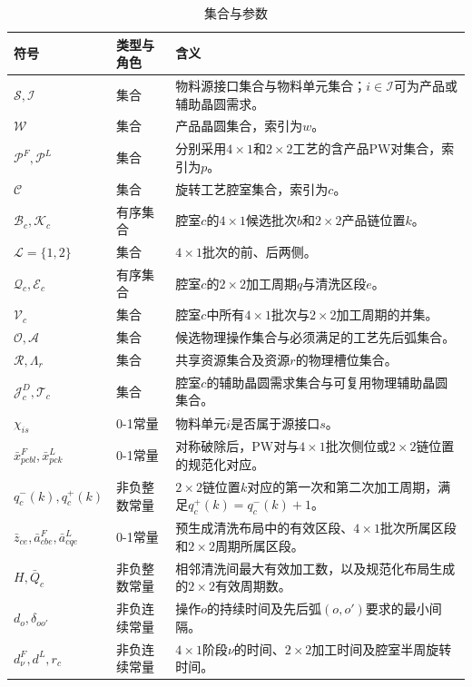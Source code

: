\documentclass[final,5p,times,twocolumn]{elsarticle}
\begin{document}
\begin{table}[t]
\centering
\scriptsize
\setlength{\tabcolsep}{2.5pt}
\caption{集合与参数}
\label{tab:symbol-cn-a}
\begin{tabular}{p{}p{}p{}}
\toprule
符号 & 类型与角色 & 含义 \\
\midrule
$\mathcal S,\mathcal I$ & 集合 & 物料源接口集合与物料单元集合；$i\in\mathcal I$可为产品或辅助晶圆需求。\\
$\mathcal W$ & 集合 & 产品晶圆集合，索引为$w$。\\
$\mathcal P^F,\mathcal P^L$ & 集合 & 分别采用$4\times1$和$2\times2$工艺的含产品PW对集合，索引为$p$。\\
$\mathcal C$ & 集合 & 旋转工艺腔室集合，索引为$c$。\\
$\mathcal B_c,\mathcal K_c$ & 有序集合 & 腔室$c$的$4\times1$候选批次$b$和$2\times2$产品链位置$k$。\\
$\mathcal L=\{1,2\}$ & 集合 & $4\times1$批次的前、后两侧。\\
$\mathcal Q_c,\mathcal E_c$ & 有序集合 & 腔室$c$的$2\times2$加工周期$q$与清洗区段$e$。\\
$\mathcal V_c$ & 集合 & 腔室$c$中所有$4\times1$批次与$2\times2$加工周期的并集。\\
$\mathcal O,\mathcal A$ & 集合 & 候选物理操作集合与必须满足的工艺先后弧集合。\\
$\mathcal R,\Lambda_r$ & 集合 & 共享资源集合及资源$r$的物理槽位集合。\\
$\mathcal J_c^D,\mathcal T_c$ & 集合 & 腔室$c$的辅助晶圆需求集合与可复用物理辅助晶圆集合。\\
$\chi_{is}$ & 0-1常量 & 物料单元$i$是否属于源接口$s$。\\
$\bar x^F_{pcbl},\bar x^L_{pck}$ & 0-1常量 & 对称破除后，PW对与$4\times1$批次侧位或$2\times2$链位置的规范化对应。\\
$q_c^-(k),q_c^+(k)$ & 非负整数常量 & $2\times2$链位置$k$对应的第一次和第二次加工周期，满足$q_c^+(k)=q_c^-(k)+1$。\\
$\bar z_{ce},\bar a^F_{cbe},\bar a^L_{cqe}$ & 0-1常量 & 预生成清洗布局中的有效区段、$4\times1$批次所属区段和$2\times2$周期所属区段。\\
$H,\bar Q_c$ & 非负整数常量 & 相邻清洗间最大有效加工数，以及规范化布局生成的$2\times2$有效周期数。\\
$d_o,\delta_{oo'}$ & 非负连续常量 & 操作$o$的持续时间及先后弧$(o,o')$要求的最小间隔。\\
$d^F_\nu,d^L,r_c$ & 非负连续常量 & $4\times1$阶段$\nu$的时间、$2\times2$加工时间及腔室半周旋转时间。\\

\end{tabular}
\end{table}
\end{document}
